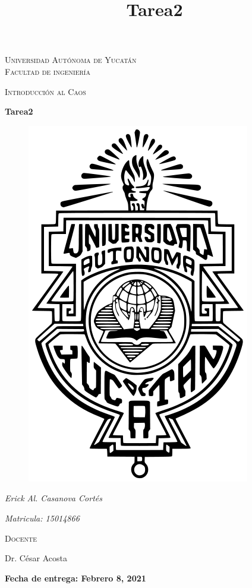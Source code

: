 \documentclass[11pt]{report}
\theoremstyle{plain}
\theoremstyle{definition}
\begin{document}
\begin{titlepage}
\title{Tarea2}


	\centering
	{\scshape\LARGE Universidad Autónoma de Yucatán  \\ Facultad de ingeniería\par}
	\vspace{1cm}
	{\scshape\Large Introducción al Caos\par}
	\vspace{1.5cm}
	{\huge\bfseries Tarea2\par}
	\vspace{0.7cm}
	{\begin{figure}[!h]
	\centering
    \includegraphics[scale=0.3]{UADY.png}
	\end{figure}}
	\vspace{0.7cm}
	{\Large\itshape Erick Al. Casanova Cortés\par}
	{\Large\itshape Matricula: 15014866\par}
	\vfill
	{\scshape\Large Docente\par
	Dr. César Acosta\par}
	\vfill
	{\Large{\bfseries Fecha de entrega: Febrero 8, 2021} }

	\vfill
	
\end{titlepage}
\end{document}
